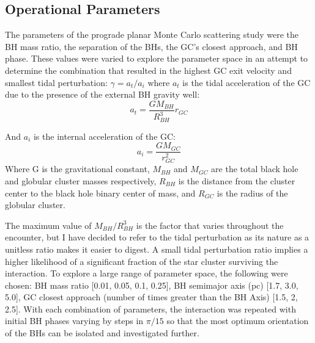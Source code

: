 \documentclass{aastex62}
\begin{document}
\subsection{Operational Parameters}
The parameters of the prograde planar Monte Carlo scattering study were the BH mass ratio, the separation of the BHs, the GC's closest approach, and BH phase. These values were varied to explore the parameter space in an attempt to determine the combination that resulted in the highest GC exit velocity and smallest tidal perturbation: $\gamma = {a_{t}}/{a_i}$ where $a_{t}$ is the tidal acceleration of the GC due to the presence of the external BH gravity well:
\begin{equation}
a_{t} = \frac{GM_{BH}}{R_{BH}^3}r_{GC}
\end{equation}

And $a_{i}$ is the internal acceleration of the GC:
\begin{equation}
a_{i} = \frac{GM_{GC}}{r_{GC}^2}
\end{equation}
Where G is the gravitational constant, $M_{BH}$ and $M_{GC}$ are the total black hole and globular cluster masses respectively, $R_{BH}$ is the distance from the cluster center to the black hole binary center of mass, and $R_{GC}$ is the radius of the globular cluster.

The maximum value of $M_{BH}/R_{BH}^3$ is the factor that varies throughout the encounter, but I have decided to refer to the tidal perturbation as its nature as a unitless ratio makes it easier to digest. A small tidal perturbation ratio implies a higher likelihood of a significant fraction of the star cluster surviving the interaction. To explore a large range of parameter space, the following were chosen: BH mass ratio [0.01, 0.05, 0.1, 0.25], BH semimajor axis (pc) [1.7, 3.0, 5.0], GC closest approach (number of times greater than the BH Axis) [1.5, 2, 2.5]. With each combination of parameters, the interaction was repeated with initial BH phases varying by steps in $\pi/15$ so that the most optimum orientation of the BHs can be isolated and investigated further. 
\end{document}
